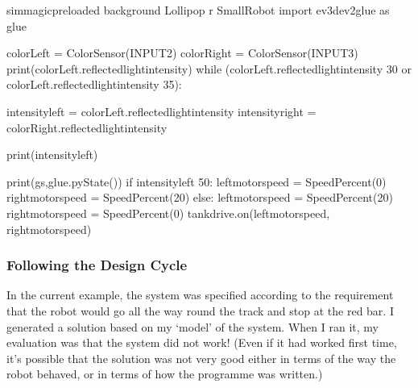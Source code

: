 \documentclass[letterpaper,10pt,english]{sphinxmanual}
\begin{document}
{

{
\begin{sphinxVerbatim}[commandchars=\\\{\}]
\llap{\color{nbsphinxin}[ ]:\,\hspace{\fboxrule}\hspace{\fboxsep}}\PYGZpc{}\PYGZpc{}sim\PYGZus{}magic\PYGZus{}preloaded \PYGZhy{}\PYGZhy{}background Lollipop \PYGZhy{}r Small\PYGZus{}Robot
import ev3dev2\PYGZus{}glue as glue

colorLeft = ColorSensor(INPUT\PYGZus{}2)
colorRight = ColorSensor(INPUT\PYGZus{}3)
print(colorLeft.reflected\PYGZus{}light\PYGZus{}intensity)
while (colorLeft.reflected\PYGZus{}light\PYGZus{}intensity \PYGZlt{} 30 or colorLeft.reflected\PYGZus{}light\PYGZus{}intensity \PYGZgt{} 35):

    intensity\PYGZus{}left = colorLeft.reflected\PYGZus{}light\PYGZus{}intensity
    \PYGZsh{}intensity\PYGZus{}right = colorRight.reflected\PYGZus{}light\PYGZus{}intensity

    print(intensity\PYGZus{}left)

    print(\PYGZsq{}gs\PYGZsq{},glue.pyState())
    if intensity\PYGZus{}left \PYGZlt{} 50:
        left\PYGZus{}motor\PYGZus{}speed = SpeedPercent(0)
        right\PYGZus{}motor\PYGZus{}speed = SpeedPercent(20)
    else:
        left\PYGZus{}motor\PYGZus{}speed = SpeedPercent(20)
        right\PYGZus{}motor\PYGZus{}speed = SpeedPercent(0)
    tank\PYGZus{}drive.on(left\PYGZus{}motor\PYGZus{}speed, right\PYGZus{}motor\PYGZus{}speed)

\end{sphinxVerbatim}
}


\subsubsection{Following the Design Cycle}
\label{\detokenize{content/04_Robot_Lab/Section_00_04:Following-the-Design-Cycle}}
In the current example, the system was specified according to the requirement that the robot would go all the way round the track and stop at the red bar. I generated a solution based on my ‘model’ of the system. When I ran it, my evaluation was that the system did not work! (Even if it had worked first time, it’s possible that the solution was not very good either in terms of the way the robot behaved, or in terms of how the programme was written.)

}
\end{document}
